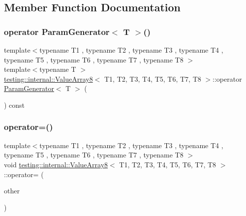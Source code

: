 \subsection{Member Function Documentation}
\mbox{\label{classtesting_1_1internal_1_1_value_array8_a265f6e8bc6ceede7e673682ddebb82c5}} 
\subsubsection{\texorpdfstring{operator ParamGenerator$<$ T $>$()}{operator ParamGenerator< T >()}}
{\footnotesize\ttfamily template$<$typename T1 , typename T2 , typename T3 , typename T4 , typename T5 , typename T6 , typename T7 , typename T8 $>$ \\
template$<$typename T $>$ \\
\mbox{\hyperlink{classtesting_1_1internal_1_1_value_array8}{testing\+::internal\+::\+Value\+Array8}}$<$ T1, T2, T3, T4, T5, T6, T7, T8 $>$\+::operator \mbox{\hyperlink{classtesting_1_1internal_1_1_param_generator}{Param\+Generator}}$<$ T $>$ (\begin{DoxyParamCaption}{ }\end{DoxyParamCaption}) const\hspace{0.3cm}{\ttfamily [inline]}}

\mbox{\label{classtesting_1_1internal_1_1_value_array8_a35cb246a13f4f87329d08ec401c6ffff}} 
\subsubsection{\texorpdfstring{operator=()}{operator=()}}
{\footnotesize\ttfamily template$<$typename T1 , typename T2 , typename T3 , typename T4 , typename T5 , typename T6 , typename T7 , typename T8 $>$ \\
void \mbox{\hyperlink{classtesting_1_1internal_1_1_value_array8}{testing\+::internal\+::\+Value\+Array8}}$<$ T1, T2, T3, T4, T5, T6, T7, T8 $>$\+::operator= (\begin{DoxyParamCaption}\item[{const \mbox{\hyperlink{classtesting_1_1internal_1_1_value_array8}{Value\+Array8}}$<$ T1, T2, T3, T4, T5, T6, T7, T8 $>$ \&}]{other }\end{DoxyParamCaption})\hspace{0.3cm}{\ttfamily [private]}}




